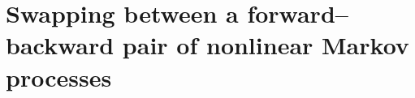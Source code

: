 \documentclass[english,11pt]{article}%
\numberwithin{equation}{section}
\numberwithin{example}{section}
\numberwithin{theorem}{section}
\begin{document}




\section{Swapping between a forward--backward pair of nonlinear Markov
processes}
\end{document}
